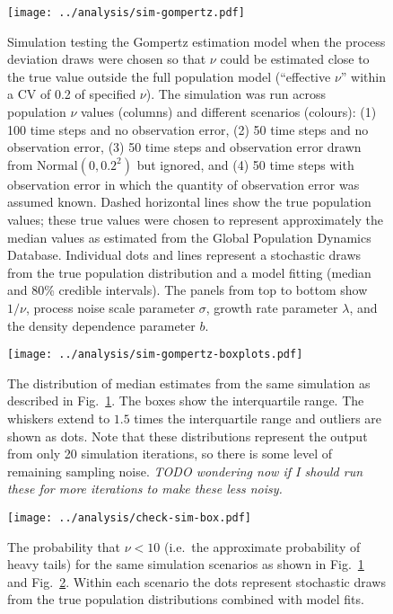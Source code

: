 \clearpage

\begin{figure}[htbp]
\begin{center}
\texttt{[image: ../analysis/sim-gompertz.pdf]}
\caption{
  Simulation testing the Gompertz estimation model when the process deviation
  draws were chosen so that $\nu$ could be estimated close to the true value
  outside the full population model (``effective $\nu$'' within a CV of 0.2 of
  specified $\nu$). The simulation was run across population $\nu$ values
  (columns) and different scenarios (colours): (1) 100 time steps and no
  observation error, (2) 50 time steps and no observation error, (3) 50 time
  steps and observation error drawn from $\mathrm{Normal} (0, 0.2^2)$ but
  ignored, and (4) 50 time steps with observation error in which the quantity
  of observation error was assumed known. Dashed horizontal lines show the true
  population values; these true values were chosen to represent approximately
  the median values as estimated from the Global Population Dynamics Database.
  Individual dots and lines
  represent a stochastic draws from the true population distribution and
  a model fitting (median and 80\% credible intervals). The panels from top to
  bottom show $1/\nu$, process noise scale parameter $\sigma$, growth rate
  parameter $\lambda$, and the density dependence parameter $b$.
}
\label{fig:sim-gompertz}
\end{center}
\end{figure}

\clearpage

\begin{figure}[htbp]
\begin{center}
\texttt{[image: ../analysis/sim-gompertz-boxplots.pdf]}
\caption{
  The distribution of median estimates from the same simulation as described in
  Fig.~\ref{fig:sim-gompertz}. The boxes show the interquartile range. The
  whiskers extend to $1.5$ times the interquartile range and outliers are shown
  as dots. Note that these distributions represent the output from only 20
  simulation iterations, so there is some level of remaining sampling noise.
  \textit{TODO wondering now if I should run these for more iterations to make
    these less noisy.}
}
\label{fig:sim-gompertz-boxplots}
\end{center}
\end{figure}

\clearpage

\begin{figure}[htbp]
\begin{center}
\texttt{[image: ../analysis/check-sim-box.pdf]}
\caption{
  The probability that $\nu < 10$ (i.e.\ the approximate probability of heavy
  tails) for the same simulation scenarios as shown in
  Fig.~\ref{fig:sim-gompertz} and Fig.~\ref{fig:sim-gompertz-boxplots}. Within
  each scenario the dots represent stochastic draws from the true population
  distributions combined with model fits.
}
\label{fig:sim-prob}
\end{center}
\end{figure}


